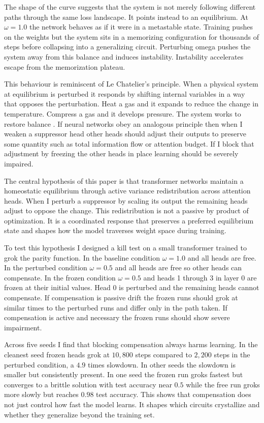 The shape of the curve suggests that the system is not merely following different paths through the same loss landscape. It points instead to an equilibrium. At $\omega = 1.0$ the network behaves as if it were in a metastable state. Training pushes on the weights but the system sits in a memorizing configuration for thousands of steps before collapsing into a generalizing circuit. Perturbing omega pushes the system away from this balance and induces instability. Instability accelerates escape from the memorization plateau.

This behaviour is reminiscent of Le Chatelier's principle. When a physical system at equilibrium is perturbed it responds by shifting internal variables in a way that opposes the perturbation. Heat a gas and it expands to reduce the change in temperature. Compress a gas and it develops pressure. The system works to restore balance \cite{kringelbach2024thermodynamics}. If neural networks obey an analogous principle then when I weaken a suppressor head other heads should adjust their outputs to preserve some quantity such as total information flow or attention budget. If I block that adjustment by freezing the other heads in place learning should be severely impaired.

The central hypothesis of this paper is that transformer networks maintain a homeostatic equilibrium through active variance redistribution across attention heads. When I perturb a suppressor by scaling its output the remaining heads adjust to oppose the change. This redistribution is not a passive by product of optimization. It is a coordinated response that preserves a preferred equilibrium state and shapes how the model traverses weight space during training.

To test this hypothesis I designed a kill test on a small transformer trained to grok the parity function. In the baseline condition $\omega = 1.0$ and all heads are free. In the perturbed condition $\omega = 0.5$ and all heads are free so other heads can compensate. In the frozen condition $\omega = 0.5$ and heads 1 through 3 in layer 0 are frozen at their initial values. Head 0 is perturbed and the remaining heads cannot compensate. If compensation is passive drift the frozen runs should grok at similar times to the perturbed runs and differ only in the path taken. If compensation is active and necessary the frozen runs should show severe impairment.

Across five seeds I find that blocking compensation always harms learning. In the cleanest seed frozen heads grok at $10{,}800$ steps compared to $2{,}200$ steps in the perturbed condition, a $4.9$ times slowdown. In other seeds the slowdown is smaller but consistently present. In one seed the frozen run groks fastest but converges to a brittle solution with test accuracy near $0.5$ while the free run groks more slowly but reaches $0.98$ test accuracy. This shows that compensation does not just control how fast the model learns. It shapes which circuits crystallize and whether they generalize beyond the training set.

